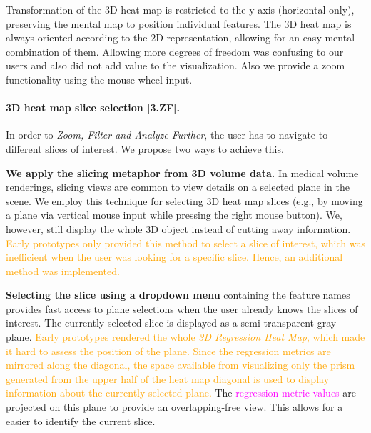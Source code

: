 \documentclass[journal]{style/vgtc} 			          %
\newcommand{\design}[1]{\textcolor{orange}{#1}}
\newcommand{\magenta}[1]{\textcolor{magenta}{#1}}
\begin{document}
Transformation of the 3D heat map is restricted to the y-axis (horizontal only), preserving the mental map to position individual features.
The 3D heat map is always oriented according to the 2D representation, allowing for an easy mental combination of them.
Allowing more degrees of freedom was confusing to our users and also did not add value to the visualization.
Also we provide a zoom functionality using the mouse wheel input.
\paragraph{3D heat map slice selection [\textbf{3.ZF}].}
In order to \emph{Zoom, Filter and Analyze Further}, the user has to navigate to different slices of interest.
We propose two ways to achieve this.

	\textbf{We apply the slicing metaphor from 3D volume data.}
	In medical volume renderings, slicing views are common to view details on a selected plane in the scene.
	We employ this technique for selecting 3D heat map slices (e.g., by moving a plane via vertical mouse input while pressing the right mouse button).
	We, however, still display the whole 3D object instead of cutting away information. %
	\design{Early prototypes only provided this method to select a slice of interest, which was inefficient when the user was looking for a specific slice.
	Hence, an additional method was implemented.
	}

	\textbf{Selecting the slice using a dropdown menu} containing the feature names provides fast access to plane selections when the user already knows the slices of interest.
The currently selected slice is displayed as a semi-transparent gray plane.
\design{
Early prototypes rendered the whole \emph{3D Regression Heat Map}, which made it hard to assess the position of the plane.
Since the regression metrics are mirrored along the diagonal, the space available from visualizing only the prism generated from the upper half of the heat map diagonal is used to display information about the currently selected plane.
}
The \magenta{regression metric values} are projected on this plane to provide an overlapping-free view.
This allows for a easier to identify the current slice.
\end{document}
